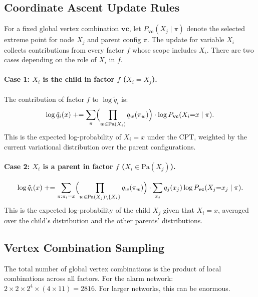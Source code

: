 \documentclass[11pt]{article}
\begin{document}
\subsection{Coordinate Ascent Update Rules}\label{sec:update}

For a fixed global vertex combination $\mathbf{vc}$, let $P_{\mathbf{vc}}(X_j \mid \pi)$
denote the selected extreme point for node $X_j$ and parent config $\pi$.
The update for variable $X_i$ collects contributions from every factor $f$ whose scope
includes $X_i$. There are two cases depending on the role of $X_i$ in $f$.

\paragraph{Case 1: $X_i$ is the child in factor $f$ ($X_i = X_j$).}
The contribution of factor $f$ to $\log \tilde{q}_i$ is:
\begin{equation}\label{eq:case1}
  \log \tilde{q}_i(x) \mathrel{+}= \sum_{\pi}
  \Bigl(\prod_{w \in \mathrm{Pa}(X_i)} q_w(\pi_w)\Bigr)
  \cdot \log P_{\mathbf{vc}}(X_i{=}x \mid \pi).
\end{equation}
This is the expected log-probability of $X_i = x$ under the CPT, weighted by the
current variational distribution over the parent configurations.

\paragraph{Case 2: $X_i$ is a parent in factor $f$ ($X_i \in \mathrm{Pa}(X_j)$).}
\begin{equation}\label{eq:case2}
  \log \tilde{q}_i(x) \mathrel{+}= \sum_{\pi : \pi_i = x}
  \Bigl(\prod_{w \in \mathrm{Pa}(X_j) \setminus \{X_i\}} q_w(\pi_w)\Bigr)
  \cdot \sum_{x_j} q_j(x_j) \log P_{\mathbf{vc}}(X_j{=}x_j \mid \pi).
\end{equation}
This is the expected log-probability of the child $X_j$ given that $X_i = x$,
averaged over the child's distribution and the other parents' distributions.

\subsection{Vertex Combination Sampling}

The total number of global vertex combinations is the product of local combinations
across all factors. For the alarm network: $2 \times 2 \times 2^4 \times (4 \times 11) = 2816$.
For larger networks, this can be enormous.
\end{document}
